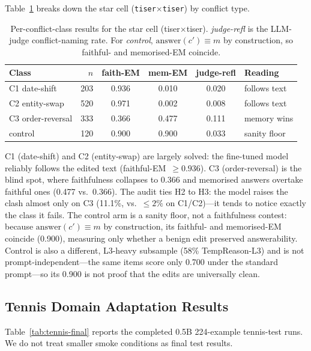 \documentclass[conference]{IEEEtran}
\begin{document}
Table~\ref{tab:perclass} breaks down the star cell (\texttt{tiser}$\times$\texttt{tiser}) by conflict type.

\begin{table}[t]
\centering
\caption{Per-conflict-class results for the star cell (tiser$\times$tiser). \emph{judge-refl} is the LLM-judge conflict-naming rate. For \emph{control}, $\text{answer}(c'){\equiv}m$ by construction, so faithful- and memorised-EM coincide.}
\label{tab:perclass}
\setlength{\tabcolsep}{4pt}
{\footnotesize
\begin{tabular}{lrcccl}
\toprule
\textbf{Class} & \textbf{$n$} & \textbf{faith-EM} & \textbf{mem-EM} & \textbf{judge-refl} & \textbf{Reading} \\
\midrule
C1 date-shift      & 203 & 0.936 & 0.010 & 0.020 & follows text \\
C2 entity-swap     & 520 & 0.971 & 0.002 & 0.008 & follows text \\
C3 order-reversal  & 333 & 0.366 & 0.477 & 0.111 & memory wins  \\
control            & 120 & 0.900 & 0.900 & 0.033 & sanity floor \\
\bottomrule
\end{tabular}
}
\end{table}

C1 (date-shift) and C2 (entity-swap) are largely solved: the fine-tuned model reliably follows the edited text (faithful-EM~${\geq}0.936$). C3 (order-reversal) is the blind spot, where faithfulness collapses to 0.366 and memorised answers overtake faithful ones (0.477 vs.\ 0.366). The audit ties H2 to H3: the model raises the clash almost only on C3 (11.1\%, vs.\ ${\leq}2\%$ on C1/C2)---it tends to notice exactly the class it fails. The control arm is a sanity floor, not a faithfulness contest: because $\text{answer}(c'){\equiv}m$ by construction, its faithful- and memorised-EM coincide (0.900), measuring only whether a benign edit preserved answerability. Control is also a different, L3-heavy subsample (58\% TempReason-L3) and is not prompt-independent---the same items score only 0.700 under the standard prompt---so its 0.900 is not proof that the edits are universally clean.

\subsection{Tennis Domain Adaptation Results}

Table~\ref{tab:tennis-final} reports the completed 0.5B 224-example tennis-test runs. We do not treat smaller smoke conditions as final test results.
\end{document}
